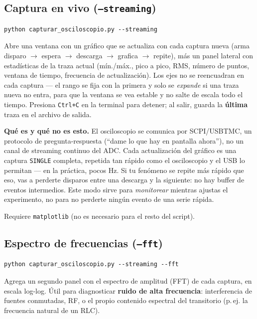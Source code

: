 \documentclass[11pt,a4paper]{article}
\begin{document}
\subsection{Captura en vivo (\texttt{--streaming})}
\begin{lstlisting}
python capturar_osciloscopio.py --streaming
\end{lstlisting}
Abre una ventana con un gráfico que se actualiza con cada captura nueva
(arma disparo $\to$ espera $\to$ descarga $\to$ grafica $\to$ repite), más
un panel lateral con estadísticas de la traza actual (mín./máx., pico a
pico, RMS, número de puntos, ventana de tiempo, frecuencia de
actualización). Los ejes no se reencuadran en cada captura --- el rango se
fija con la primera y solo se \emph{expande} si una traza nueva no entra,
para que la ventana se vea estable y no salte de escala todo el tiempo.
Presiona \texttt{Ctrl+C} en la terminal para detener; al salir, guarda la
\textbf{última} traza en el archivo de salida.

\begin{aviso}
\textbf{Qué es y qué no es esto.} El osciloscopio se comunica por
SCPI/USBTMC, un protocolo de pregunta-respuesta (``dame lo que hay en
pantalla ahora''), no un canal de streaming continuo del ADC. Cada
actualización del gráfico es una captura \texttt{SINGLE} completa, repetida
tan rápido como el osciloscopio y el USB lo permitan --- en la práctica,
pocos Hz. Si tu fenómeno se repite más rápido que eso, vas a perderte
disparos entre una descarga y la siguiente: no hay buffer de eventos
intermedios. Este modo sirve para \emph{monitorear} mientras ajustas el
experimento, no para no perderte ningún evento de una serie rápida.
\end{aviso}

Requiere \texttt{matplotlib} (no es necesario para el resto del script).

\subsection{Espectro de frecuencias (\texttt{--fft})}
\begin{lstlisting}
python capturar_osciloscopio.py --streaming --fft
\end{lstlisting}
Agrega un segundo panel con el espectro de amplitud (FFT) de cada captura,
en escala log-log. Útil para diagnosticar \textbf{ruido de alta
frecuencia}: interferencia de fuentes conmutadas, RF, o el propio contenido
espectral del transitorio (p.\,ej. la frecuencia natural de un RLC).
\end{document}
